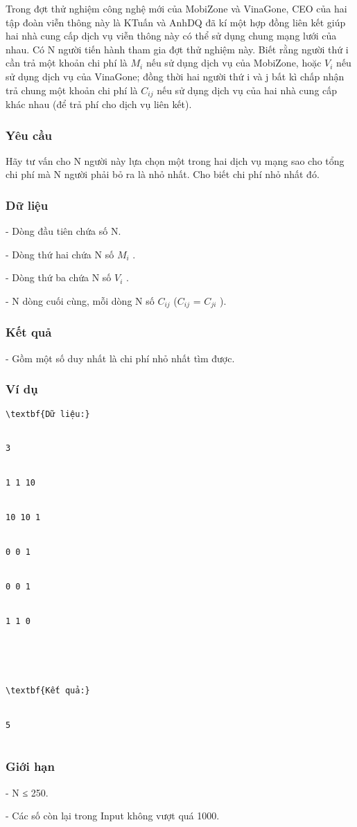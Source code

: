 







   Trong đợt thử nghiệm công nghệ mới của MobiZone và VinaGone, CEO của hai tập đoàn viễn thông này là KTuấn và AnhDQ đã kí một hợp đồng liên kết giúp hai nhà cung cấp dịch vụ viễn thông này có thể sử dụng chung mạng lưới của nhau. Có N người tiến hành tham gia đợt thử nghiệm này. Biết rằng người thứ i cần trả một khoản chi phí là $M_{i}$   nếu sử dụng dịch vụ của MobiZone, hoặc $V_{i}$   nếu sử dụng dịch vụ của VinaGone; đồng thời hai người thứ i và j bất kì chấp nhận trả chung một khoản chi phí là $C_{ij}$   nếu sử dụng dịch vụ của hai nhà cung cấp khác nhau (để trả phí cho dịch vụ liên kết).  

\subsubsection{   Yêu cầu  }

   Hãy tư vấn cho N người này lựa chọn một trong hai dịch vụ mạng sao cho tổng chi phí mà N người phải bỏ ra là nhỏ nhất. Cho biết chi phí nhỏ nhất đó.  

\subsubsection{   Dữ liệu  }

   - Dòng đầu tiên chứa số N.   


   - Dòng thứ hai chứa N số $M_{i}$   .   


   - Dòng thứ ba chứa N số $V_{i}$   .   


   - N dòng cuối cùng, mỗi dòng N số $C_{ij}$   ($C_{ij}$   = $C_{ji}$   ).  

\subsubsection{   Kết quả  }

   - Gồm một số duy nhất là chi phí nhỏ nhất tìm được.  

\subsubsection{   Ví dụ  }
\begin{verbatim}
\textbf{Dữ liệu:}


3


1 1 10


10 10 1


0 0 1


0 0 1


1 1 0





\textbf{Kết quả:}


5


\end{verbatim}

\subsubsection{   Giới hạn  }

   - N ≤ 250.   


   - Các số còn lại trong Input không vượt quá 1000.  

